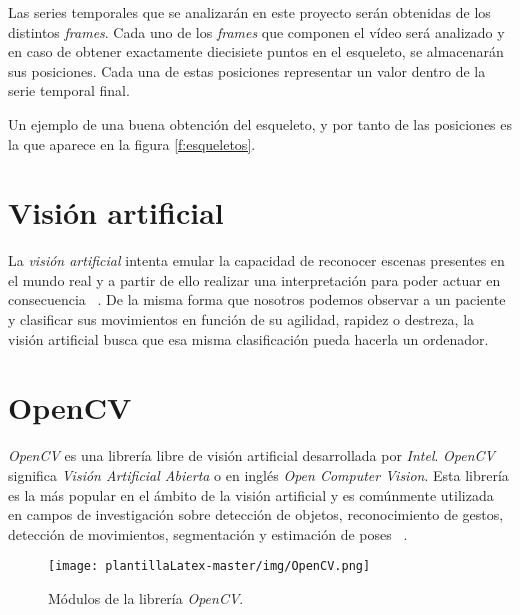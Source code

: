 Las series temporales que se analizarán en este proyecto serán obtenidas de los distintos \textit{frames}. Cada uno de los \textit{frames} que componen el vídeo será analizado y en caso de obtener exactamente diecisiete puntos en el esqueleto, se almacenarán sus posiciones. Cada una de estas posiciones representar un valor dentro de la serie temporal final. 

Un ejemplo de una buena obtención del esqueleto, y por tanto de las posiciones es la que aparece en la figura \ref{f:esqueletos}.

\section{Visión artificial}

La \emph{visión artificial} intenta emular la capacidad de reconocer escenas presentes en el mundo real y a partir de ello realizar una interpretación para poder actuar en consecuencia ~\cite{marcos2006tecnicas}. De la misma forma que nosotros podemos observar a un paciente y clasificar sus movimientos en función de su agilidad, rapidez o destreza, la visión artificial busca que esa misma clasificación pueda hacerla un ordenador. 

\newpage
\section{OpenCV}

\textit{OpenCV} es una librería libre de visión artificial desarrollada por \textit{Intel}. \textit{OpenCV} significa \textit{Visión Artificial Abierta} o en inglés \textit{Open Computer Vision}. Esta librería es la más popular en el ámbito de la visión artificial y es comúnmente utilizada en campos de investigación sobre detección de objetos, reconocimiento de gestos, detección de movimientos, segmentación y estimación de poses ~\cite{arevalo2004libreria}.

\begin{figure}[H]
    \centering
    \texttt{[image: plantillaLatex-master/img/OpenCV.png]}
    \caption{Módulos de la librería \textit{OpenCV}.}
    \label{fig:openCv}
\end{figure}

